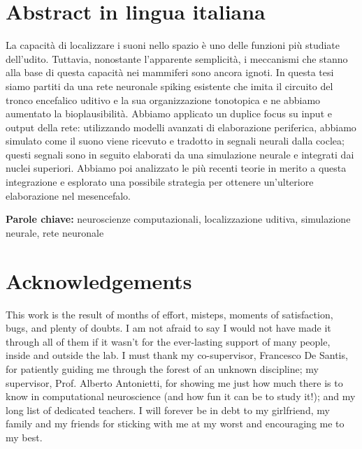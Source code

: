 \documentclass[11pt,a4paper]{article}
\begin{document}
\section*{Abstract in lingua italiana}
La capacità di localizzare i suoni nello spazio è uno delle funzioni più studiate dell'udito. Tuttavia, nonostante l'apparente semplicità, i meccanismi che stanno alla base di questa capacità nei mammiferi sono ancora ignoti. In questa tesi siamo partiti da
una rete neuronale spiking esistente che imita il circuito del tronco encefalico uditivo e la sua organizzazione tonotopica e ne abbiamo aumentato la bioplausibilità. Abbiamo applicato un duplice focus su input e output della rete: utilizzando modelli avanzati di elaborazione periferica, abbiamo simulato come il suono viene ricevuto e tradotto in segnali neurali dalla coclea; questi segnali sono in seguito elaborati da una simulazione neurale e integrati dai nuclei superiori. Abbiamo poi analizzato le più recenti teorie in merito a questa integrazione
e esplorato una possibile strategia per ottenere un'ulteriore elaborazione nel mesencefalo.
\vspace{15pt}
\begin{tcolorbox}[arc=0pt, boxrule=0pt, colback=bluePoli!60, width=\textwidth, colupper=white]
    \textbf{Parole chiave:} neuroscienze computazionali, localizzazione uditiva, simulazione neurale, rete neuronale 
\end{tcolorbox}

\section*{Acknowledgements}
This work is the result of months of effort, misteps, moments of satisfaction, bugs, and plenty of doubts. I am not afraid to say I would not have made it through all of them if it wasn't for the ever-lasting support of many people, inside and outside the lab. I must thank my co-supervisor, Francesco De Santis, for patiently guiding me through the forest of an unknown discipline; my supervisor, Prof. Alberto Antonietti, for showing me just how much there is to know in computational neuroscience (and how fun it can be to study it!); and my long list of dedicated teachers. 
I will forever be in debt to my girlfriend, my family and my friends for sticking with me at my worst and encouraging me to my best.

\end{document}
